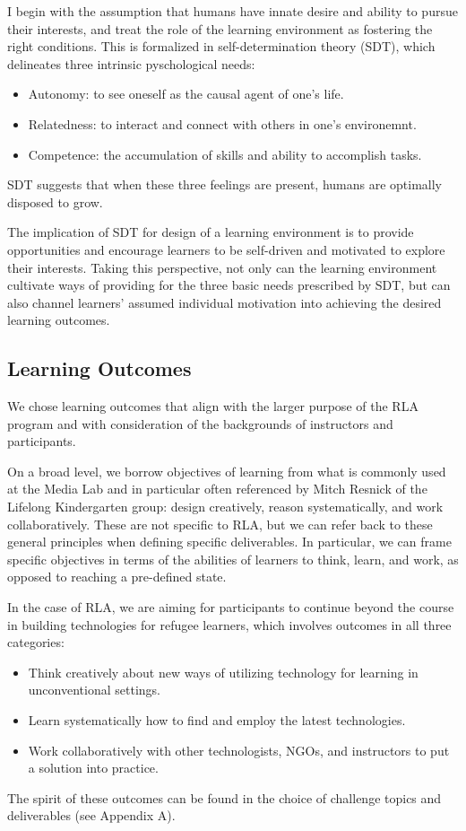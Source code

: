\documentclass[12pt,twoside]{mitthesis}
\begin{document}
I begin with the assumption that humans have innate desire and ability to pursue their interests, and treat the role of the learning environment as fostering the right conditions. This is formalized in self-determination theory (SDT), which delineates three intrinsic pyschological needs:
\begin{itemize}
\item Autonomy: to see oneself as the causal agent of one's life.
\item Relatedness: to interact and connect with others in one's environemnt.
\item Competence: the accumulation of skills and ability to accomplish tasks.
\end{itemize}
SDT suggests that when these three feelings are present, humans are optimally disposed to grow.~\cite{ryan2000self}\cite{selfdetermination2}

The implication of SDT for design of a learning environment is to provide opportunities and encourage learners to be self-driven and motivated to explore their interests. Taking this perspective, not only can the learning environment cultivate ways of providing for the three basic needs prescribed by SDT, but can also channel learners' assumed individual motivation into achieving the desired learning outcomes.~\cite{selfdetermination}\cite{niemiec2009autonomy}

\subsection{Learning Outcomes}

We chose learning outcomes that align with the larger purpose of the RLA program and with consideration of the backgrounds of instructors and participants. 

On a broad level, we borrow objectives of learning from what is commonly used at the Media Lab and in particular often referenced by Mitch Resnick of the Lifelong Kindergarten group: design creatively, reason systematically, and work collaboratively.
These are not specific to RLA, but we can refer back to these general principles when defining specific deliverables. In particular, we can frame specific objectives in terms of the abilities of learners to think, learn, and work, as opposed to reaching a pre-defined state.~\cite{roleofmaking}

In the case of RLA, we are aiming for participants to continue beyond the course in building technologies for refugee learners, which involves outcomes in all three categories:
\begin{itemize}
\item Think creatively about new ways of utilizing technology for learning in unconventional settings.
\item Learn systematically how to find and employ the latest technologies.
\item Work collaboratively with other technologists, NGOs, and instructors to put a solution into practice.
\end{itemize}
The spirit of these outcomes can be found in the choice of challenge topics and deliverables (see Appendix A).
\end{document}
